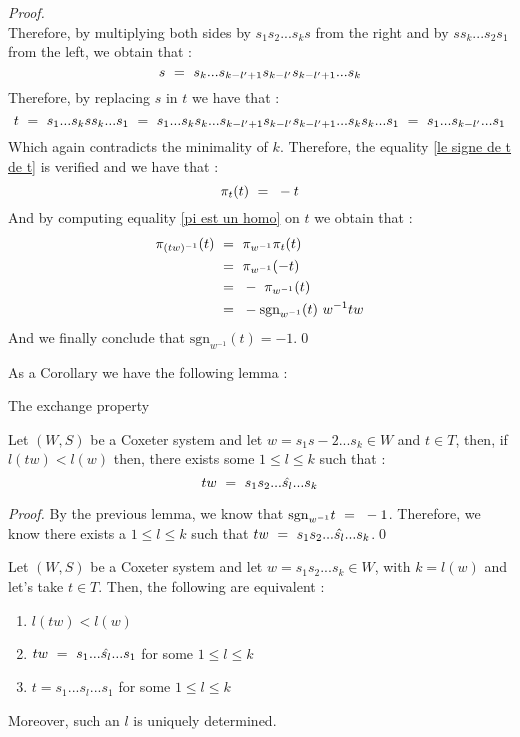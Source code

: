 \begin{proof}
\begin{equation}
	\end{equation} 
	Therefore, by multiplying both sides by $s_1s_2...s_ks$ from the right and by $ss_k...s_2s_1$ from the left, we obtain that :
	\begin{equation}
	s\text{ }=\text{ } s_k...s_{k-l'+1}s_{k-l'}s_{k-l'+1}...s_k
	\end{equation}
	Therefore, by replacing $s$ in $t$ we have that :
	\begin{equation}
	t\text{ }=\text{ } s_1...s_kss_k...s_1\text{ }=\text{ } s_1...s_ks_k...s_{k-l'+1}s_{k-l'}s_{k-l'+1}...s_ks_k...s_1\text{ }=\text{ } s_1...s_{k-l'}...s_1
	\end{equation}
	Which again contradicts the minimality of $k$. Therefore, the equality \eqref{le signe de t de t} is verified and we have that :
	\begin{equation}
	\pi_t(t)\text{ }=\text{ } -t
	\end{equation}
	And by computing equality \eqref{pi est un homo} on $t$ we obtain that :
	\begin{equation}
	\begin{split}
	\pi_{(tw)^{-1}}(t)\text{ }&=\text{ } \pi_{w^{-1}}\pi_t(t)\text{ }\\
	&=\text{ } \pi_{w^{-1}}(-t)\text{ }\\
	&=\text{ } -\text{ } \pi_{w^{-1}}(t)\\
	&=\text{ } -\mbox{sgn}_{w^{-1}}(t)\text{ } w^{-1}tw
	\end{split}
	\end{equation}
	And we finally conclude that $\mbox{sgn}_{w^{-1}}(t)=-1$.\qed 
\end{proof}
As a Corollary we have the following lemma :
\begin{lemma}\begin{center}
		The exchange property
		\end{center}
	Let $(W,S)$ be a Coxeter system and let $w=s_1s-2...s_k\in W$ and $t\in T$, then, if $l(tw)<l(w)$ then, there exists some $1\leq l\leq k$ such that :
	\begin{equation}
	tw\text{ }=\text{ } s_1s_2...\hat{s_l}... s_k
	\end{equation}
\end{lemma}
\begin{proof}
	By the previous lemma, we know that $\mbox{sgn}_{w^{-1}}t\text{ }=\text{ } -1$. Therefore, we know there exists a $1\leq l\leq k$ such that $tw\text{ }=\text{ } s_1s_2...\hat{s_l}... s_k$.\qed 
\end{proof}
\begin{lemma}
	Let $(W,S)$ be a Coxeter system and let $w=s_1s_2...s_k\in W$, with $k=l(w)$ and let's take $t\in T$. Then, the following are equivalent :
	\begin{enumerate}
		\item $l(tw)<l(w)$
		\item $tw\text{ }=\text{ } s_1...\hat{s_l}...s_1$ for some $1\leq l\leq k$
		\item $t=s_1...s_l...s_1$ for some $1\leq l\leq k$
	\end{enumerate}
Moreover, such an $l$ is uniquely determined.
\end{lemma}
